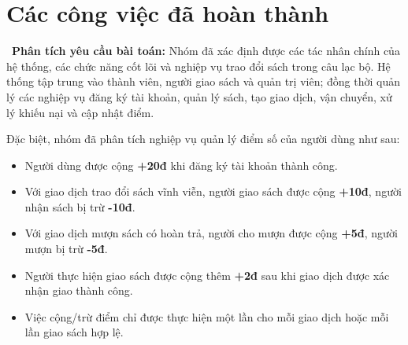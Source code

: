 \documentclass{article}
\begin{document}

\section{Các công việc đã hoàn thành}

\noindent\textbullet\ \textbf{Phân tích yêu cầu bài toán:} Nhóm đã xác định được các tác nhân chính của hệ thống, các chức năng cốt lõi và nghiệp vụ trao đổi sách trong câu lạc bộ. Hệ thống tập trung vào thành viên, người giao sách và quản trị viên; đồng thời quản lý các nghiệp vụ đăng ký tài khoản, quản lý sách, tạo giao dịch, vận chuyển, xử lý khiếu nại và cập nhật điểm.

Đặc biệt, nhóm đã phân tích nghiệp vụ quản lý điểm số của người dùng như sau:
\begin{itemize}
    \item Người dùng được cộng \textbf{+20đ} khi đăng ký tài khoản thành công.
    \item Với giao dịch trao đổi sách vĩnh viễn, người giao sách được cộng \textbf{+10đ}, người nhận sách bị trừ \textbf{-10đ}.
    \item Với giao dịch mượn sách có hoàn trả, người cho mượn được cộng \textbf{+5đ}, người mượn bị trừ \textbf{-5đ}.
    \item Người thực hiện giao sách được cộng thêm \textbf{+2đ} sau khi giao dịch được xác nhận giao thành công.
    \item Việc cộng/trừ điểm chỉ được thực hiện một lần cho mỗi giao dịch hoặc mỗi lần giao sách hợp lệ.
\end{itemize}
\end{document}
